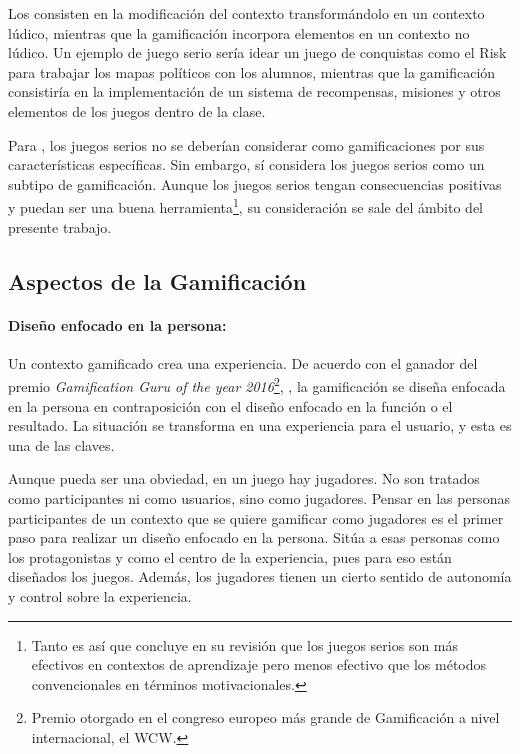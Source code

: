 Los  consisten en la modificación del contexto transformándolo en un contexto lúdico\cite{MetaSerious}, mientras que la gamificación incorpora elementos en un contexto no lúdico.
%
Un ejemplo de juego serio sería idear un juego de conquistas como el Risk para trabajar los mapas políticos con los alumnos, mientras que la gamificación consistiría en la implementación de un sistema de recompensas, misiones y otros elementos de los juegos dentro de la clase.

Para \cite{kwerb-WhatIs}, los juegos serios no se deberían considerar como gamificaciones por sus características específicas.
%
Sin embargo, \citep{GamificationDef} sí considera los juegos serios como un subtipo de gamificación.
%
Aunque los juegos serios tengan consecuencias positivas y puedan ser una buena herramienta\footnote{Tanto es así que  \cite{MetaSerious} concluye en su revisión que los juegos serios son más efectivos en contextos de aprendizaje pero menos efectivo que los métodos convencionales en términos motivacionales.}, su consideración se sale del ámbito del presente trabajo.

\subsection{Aspectos de la Gamificación}

\paragraph{Diseño enfocado en la persona:} 
Un contexto gamificado crea una experiencia.
%
De acuerdo con el ganador del premio \textit{Gamification Guru of the year 2016}\footnote{Premio otorgado en el congreso europeo más grande de Gamificación a nivel internacional, el \gls{WCW}.},  \cite{BeyondPBL}, la gamificación se diseña enfocada en la persona en contraposición con el diseño enfocado en la función o el resultado.
%
La situación se transforma en una experiencia para el usuario, y esta es una de las claves.

Aunque pueda ser una obviedad, en un juego hay jugadores. 
%
No son tratados como participantes ni como usuarios, sino como jugadores.
%
Pensar en las personas participantes de un contexto que se quiere gamificar como jugadores es el primer paso para realizar un diseño enfocado en la persona.
%
Sitúa a esas personas como los protagonistas y como el centro de la experiencia, pues para eso están diseñados los juegos.
%
Además, los jugadores tienen un cierto sentido de autonomía y control sobre la experiencia.


